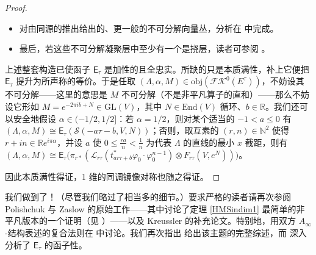 \begin{proof}
\begin{itemize}[leftmargin=0.5cm]
	\item 对由同源的推出给出的、更一般的不可分解向量丛，分析在 \cite[第 5.4 节]{[PZ00]} 中完成。
	
	\item 最后，若这些不可分解凝聚层中至少有一个是挠层，读者可参阅 \cite[第 5.5 节]{[PZ00]}。 
\end{itemize}
上述整套构造已使函子 $\mathsf{E}_\tau$ 是加性的且全忠实。所缺的只是本质满性，补上它便把 $\mathsf{E}_\tau$ 提升为所声称的等价。于是任取 $(\Lambda,\alpha,M)\in\text{obj}(\mathscr{F\!K}^0(E^\tau))$，不妨设其不可分解——这里的意思是 $M$ 不可分解（不是非平凡算子的直和）——那么不妨设它形如 $M=e^{-2\pi i b+N}\in\text{GL}(V)$，其中 $N\in\text{End}(V)$ 循环、$b\in\mathbb{R}$。我们还可以安全地假设 $\alpha\in(-1/2,1/2]$：若 $\alpha=1/2$，则对某个适当的 $-1<a\leq 0$ 有 $(\Lambda,\alpha,M)\cong\mathsf{E}_\tau(\mathcal{S}(-a\tau-b,V,N))$；否则，取互素的 $(r,n)\in\mathbb{N}^2$ 使得 $r+in\in\mathbb{R}e^{i\pi\alpha}$，并设 $a$ 使 $0\leq\frac{ra}{n}<\frac{1}{n}$ 为代表 $\Lambda$ 的直线的最小 $x$ 截距，则有 $(\Lambda,\alpha,M)\cong\mathsf{E}_\tau\big(\pi_{r*}(\mathcal{L}_{r\tau}(t_{ar\tau+b}^*\varphi_0\cdot\varphi_0^{n-1})\otimes F_{r\tau}(V, e^N))\big)$。

因此本质满性得证，1 维的同调镜像对称也随之得证。  
\end{proof}


我们做到了！（尽管我们略过了相当多的细节。）要求严格的读者请再次参阅 Polishchuk 与 Zaslow 的原始工作——其中讨论了定理 \ref{HMSindim1} 最简单的非平凡版本的一个证明（见 \cite[第 4 节]{[PZ00]}）——以及 Kreussler 的补充论文。特别地，用双方 $A_\infty$-结构表述的复合法则在 \cite{[Pol01]} 中讨论。我们再次指出 \cite{[Por15]} 给出该主题的完整综述，而 \cite{[Rei07]} 深入分析了 $\mathsf{E}_\tau$ 的函子性。


